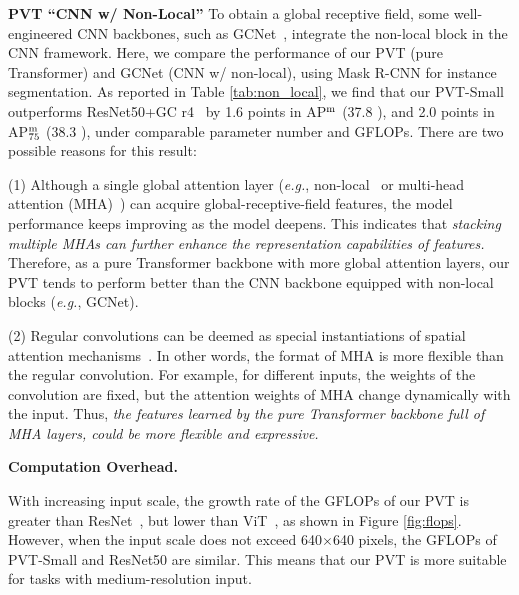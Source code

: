 \documentclass[10pt,twocolumn,letterpaper]{article}
\def\eg{\emph{e.g.}}
\begin{document}
\noindent\textbf{PVT \vs ``CNN w/ Non-Local''}
To obtain a global receptive field, some well-engineered CNN backbones, such as GCNet~\cite{cao2019gcnet}, integrate the non-local block in the CNN framework.
Here, we compare the performance of our PVT (pure Transformer) and GCNet (CNN w/ non-local), using Mask R-CNN for instance segmentation.
As reported in Table \ref{tab:non_local},  we find that our PVT-Small outperforms ResNet50+GC r4~\cite{cao2019gcnet} by 1.6 points in AP$^{\rm m}$ (37.8 ), and 2.0 points in AP$_{75}^{\rm m}$ (38.3 ), under comparable parameter number and GFLOPs. 
There are two possible reasons for this result:

(1) Although a single global attention layer (\eg, non-local~\cite{wang2018non} or multi-head attention (MHA)~\cite{vaswani2017attention}) can acquire global-receptive-field features, the model performance keeps improving as the model deepens.
%
This indicates that \emph{stacking multiple MHAs can further enhance the representation capabilities of features.}
Therefore, as a pure Transformer backbone with more global attention layers, our PVT tends to perform better than the CNN backbone equipped with non-local blocks (\eg, GCNet).

(2) Regular convolutions can be deemed
as special instantiations of spatial attention mechanisms~\cite{zhu2019empirical}. In other words, the format of MHA is more flexible than the regular convolution.
%
For example, for different inputs, the weights of the convolution are fixed, but the attention weights of MHA change dynamically with the input.
Thus, \emph{the features learned by the pure Transformer backbone full of MHA layers, could be more flexible and expressive.}

\noindent\textbf{Computation Overhead.}
\begin{table}[t]
    \centering
    \renewcommand\arraystretch{ 1.0}
    \setlength{\tabcolsep}{1.6mm}
    \footnotesize
    
     
    \caption{\textbf{Latency and AP under different input scales.} ``Scale'' and ``Time'' denote the input scale and time cost per image. When the shorter side 
    is 640 pixels, the PVT-Small+RetinaNet has a lower 
    GFLOPs and time cost (on a V100 GPU) than ResNet50+RetinaNet, while obtaining 2.4 points better AP (38.7 ).
    }
    \label{tab:speed}
\end{table}
%
With increasing input scale, the growth rate of the GFLOPs of our PVT is greater than ResNet~\cite{he2016deep}, but lower than ViT~\cite{dosovitskiy2020image}, as shown in Figure \ref{fig:flops}.
However, when the input scale does not exceed 640$\times$640 pixels, the GFLOPs of PVT-Small and ResNet50 are similar.
This means that our PVT is more suitable for tasks with medium-resolution input.
%
\end{document}
